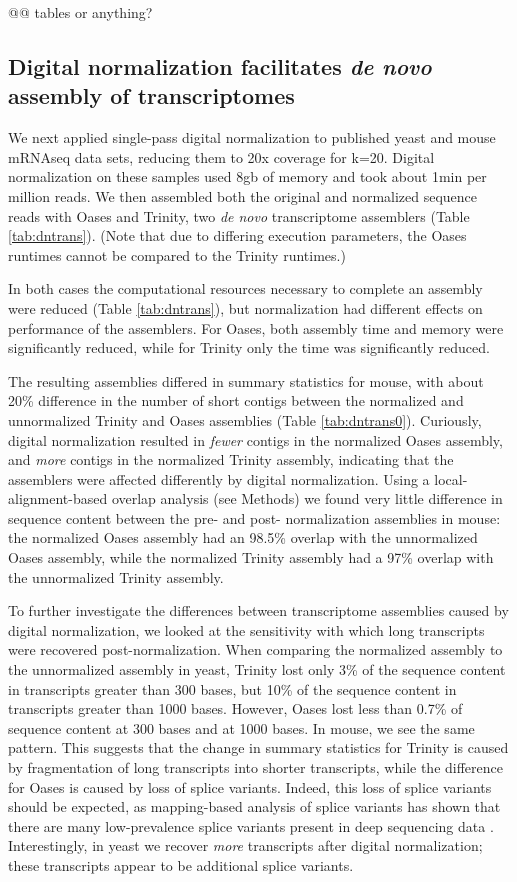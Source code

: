 \documentclass[10pt]{article}
\begin{document}
@@ tables or anything?

\subsection*{Digital normalization facilitates {\em de novo} assembly of transcriptomes}

We next applied single-pass digital normalization to published yeast
and mouse mRNAseq data sets, reducing them to 20x coverage for k=20.
Digital normalization on these samples used 8gb of memory and took
about 1min per million reads.  We then assembled both the original and
normalized sequence reads with Oases and Trinity, two {\em de novo}
transcriptome assemblers (Table \ref{tab:dntrans}).  (Note that due to
differing execution parameters, the Oases runtimes cannot be compared
to the Trinity runtimes.)

In both cases the computational resources necessary to complete an
assembly were reduced (Table \ref{tab:dntrans}), but normalization had
different effects on performance of the assemblers.  For Oases, both
assembly time and memory were significantly reduced, while for Trinity
only the time was significantly reduced.

The resulting assemblies differed in summary statistics for mouse, with about
20\% difference in the number of short contigs between the normalized
and unnormalized Trinity and Oases assemblies (Table
\ref{tab:dntrans0}).
Curiously, digital normalization resulted in {\em fewer} contigs in
the normalized Oases assembly, and {\em more} contigs in the
normalized Trinity assembly, indicating that the assemblers were
affected differently by digital normalization.
Using a local-alignment-based overlap analysis (see Methods) we found
very little difference in sequence content between the pre- and post-
normalization assemblies in mouse:
the normalized Oases assembly had an 98.5\% overlap with the
unnormalized Oases assembly, while the normalized Trinity assembly had
a 97\% overlap with the unnormalized Trinity assembly.

To further investigate the differences between transcriptome
assemblies caused by digital normalization, we looked at the
sensitivity with which long transcripts were recovered
post-normalization.  When comparing the normalized assembly to the
unnormalized assembly in yeast, Trinity lost only 3\% of the sequence
content in transcripts greater than 300 bases, but 10\% of the
sequence content in transcripts greater than 1000 bases.  However,
Oases lost less than 0.7\% of sequence content at 300 bases and at
1000 bases.  In mouse, we see the same pattern.
This suggests that the change in summary statistics for
Trinity is caused by fragmentation of long transcripts into shorter
transcripts, while the difference for Oases is caused by loss of
splice variants.  Indeed, this
loss of splice variants should be expected, as mapping-based analysis
of splice variants has shown that there are many low-prevalence splice
variants present in deep sequencing data \cite{pubmed21151575}.
Interestingly, in yeast we recover {\em more} transcripts after
digital normalization; these transcripts appear to be additional splice
variants.
\end{document}
